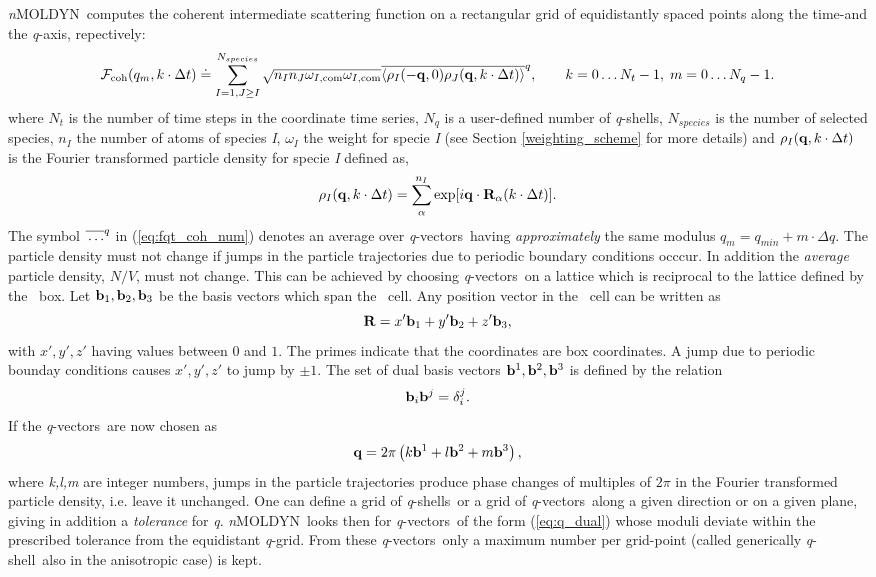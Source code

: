 \documentclass[a4paper,11pt]{report}
\newcommand{\qval}{\textit{q}}
\newcommand{\qvects}{\textit{q}-vectors}
\newcommand{\qshell}{\textit{q}-shell}
\newcommand{\qshells}{\textit{q}-shells}
\newcommand{\NMOLDYN}{\textit{n}MOLDYN}
\begin{document}
\NMOLDYN\ computes the coherent intermediate scattering function on a rectangular grid of equidistantly spaced points along 
the time-and the \qval-axis, repectively:
\begin{equation} 
\label{eq:fqt_coh_num}
{\cal F}_{\mathrm{coh}}(q_m,k\cdot\Delta t) \doteq \sum^{N_{species}}_{I=1,J\geq I} \sqrt{n_I n_J \omega_{I,\mathrm{com}}\omega_{I,\mathrm{com}}}
\overline{\langle \rho_I(-{\bf q},0)\rho_J({\bf q},k\cdot\Delta t) \rangle}^{q},
\qquad k = 0\ldots N_t - 1,\; m = 0\ldots N_q - 1. 
\end{equation} 
where $N_t$ is the number of time steps in the coordinate time series, $N_q$ is a user-defined number of \qshells, 
$N_{species}$ is the number of selected species, $n_I$ the number of atoms of species \textit{I}, $\omega_I$ the weight for specie 
\textit{I} (see Section \ref{weighting_scheme} for more details) and $\rho_I({\bf q},k\cdot\Delta t)$ is the Fourier transformed particle 
density for specie \textit{I} defined as,
\begin{equation}
\label{eq:dcsf_rho}
\rho_I({\bf q},k\cdot\Delta t) = \sum_\alpha^{n_I} \exp[i{\bf q}\cdot{\bf R}_\alpha(k\cdot\Delta t)].
\end{equation}
The symbol $\overline{\rule{0pt}{5pt}\ldots}^{q}$ in (\ref{eq:fqt_coh_num}) denotes an average over \qvects\ having 
{\em approximately} the same modulus $q_m = q_{min} + m\cdot\Delta q$. The particle density must not change if jumps in 
the particle trajectories due to periodic boundary conditions occcur. In addition the {\em average} particle density, 
$N/V$, must not change. This can be achieved by choosing \qvects\ on a lattice which is reciprocal to the lattice defined 
by the \MD\ box. Let ${\bf b}_1,{\bf b}_2,{\bf b}_3$ be the basis vectors which span the \MD\ cell. Any position vector in the 
\MD\ cell can be written as
\begin{equation}
{\bf R} = x'{\bf b}_1 + y'{\bf b}_2 + z'{\bf b}_3,
\end{equation}
with $x',y',z'$ having values between $0$ and $1$.  The primes indicate that the coordinates are box coordinates. A jump due 
to periodic bounday conditions causes $x',y',z'$ to jump by $\pm 1$.  The set of dual basis vectors ${\bf b}^1,{\bf b}^2,{\bf b}^3$ 
is defined by the relation
\begin{equation}
{\bf b}_i{\bf b}^j = \delta_i^j.
\end{equation}
If the \qvects\ are now chosen as
\begin{equation}
\label{eq:q_dual}
{\bf q} = 2\pi\left(k{\bf b}^1 + l{\bf b}^2 + m{\bf b}^3\right),
\end{equation}
where \textit{k,l,m} are integer numbers, jumps in the particle trajectories produce phase changes of multiples of $2\pi$ in the 
Fourier transformed particle density, i.e. leave it unchanged. One can define a grid of \qshells\ or a grid of \qvects\ 
along a given direction or on a given plane, giving in addition a {\em tolerance} for \qval. \NMOLDYN\ looks then for 
\qvects\ of the form (\ref{eq:q_dual}) whose moduli deviate within the prescribed tolerance from the equidistant \qval-grid. 
From these \qvects\ only a maximum number per grid-point (called generically \qshell\ also in the anisotropic case) is 
kept.
\end{document}
